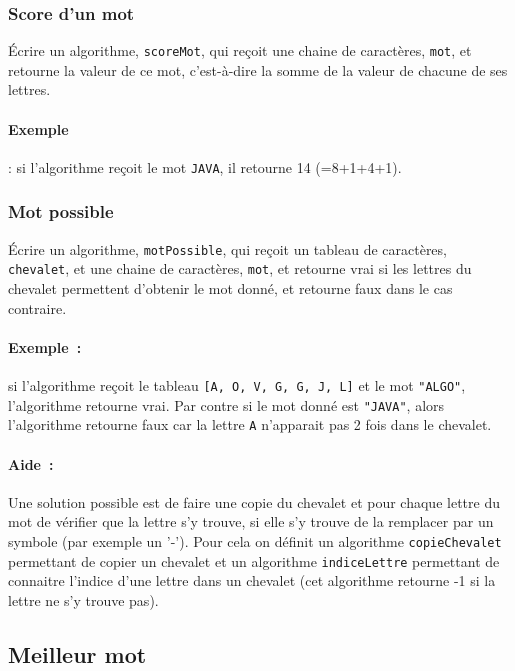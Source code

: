 		\subsubsection*{Score d’un mot}
			
			Écrire un algorithme, \texttt{scoreMot}, qui reçoit une chaine de
			caractères, \texttt{mot}, et retourne la valeur de ce mot,
			c’est-à-dire la somme de la valeur de chacune de ses lettres.
	
			\paragraph{Exemple}: si l’algorithme reçoit le mot \texttt{JAVA}, il
			retourne 14 (=8+1+4+1).
	
		\subsubsection*{Mot possible}
	
			Écrire un algorithme, \texttt{motPossible}, qui reçoit un tableau de
			caractères, \texttt{chevalet}, et une chaine de caractères,
			\texttt{mot}, et retourne vrai si les lettres du chevalet permettent
			d’obtenir le mot donné, et retourne faux dans le cas contraire. 
	
	
			\paragraph{Exemple~:} si l’algorithme reçoit le tableau \texttt{[A,
			O, V, G, G, J, L]} et le mot \texttt{"ALGO"}, l’algorithme retourne
			vrai.  Par contre si le mot donné est \texttt{"JAVA"}, alors
			l’algorithme retourne faux car la lettre \texttt{A} n’apparait pas
			2 fois dans le chevalet.
	
	
			\paragraph{Aide~:} Une solution possible est de faire une copie du
			chevalet et pour chaque lettre du mot de vérifier que la lettre s’y
			trouve, si elle s’y trouve de la remplacer par un symbole (par
			exemple un '-').  Pour cela on définit un algorithme
			\texttt{copieChevalet} permettant de copier un chevalet et un
			algorithme \texttt{indiceLettre} permettant de connaitre l’indice
			d’une lettre dans un chevalet (cet algorithme retourne -1 si la
			lettre ne s’y trouve pas). 
	
		\subsection*{Meilleur mot}
	
